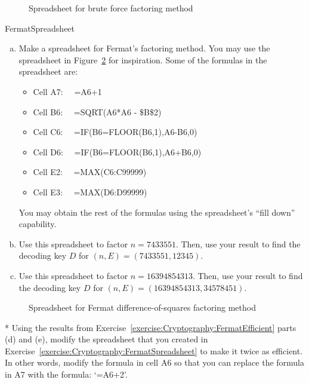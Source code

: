 \begin{figure}[h]
\caption{Spreadsheet for brute force factoring method}
\label{fig:bf}
\end{figure}


\begin{exercise}{FermatSpreadsheet}
\begin{enumerate}[(a)]
\item
Make a spreadsheet for Fermat's factoring method. You may use the spreadsheet in Figure~\ref{fig:FermaFact} for inspiration. Some of the formulas in the spreadsheet are:
\begin{itemize}
\item
Cell A7: ~~=A6+1
\item
Cell B6:  ~~=SQRT(A6*A6 - \$B\$2)
\item
Cell C6:  ~~=IF(B6=FLOOR(B6,1),A6-B6,0)
\item
Cell D6:  ~~=IF(B6=FLOOR(B6,1),A6+B6,0)
\item
Cell E2: ~~=MAX(C6:C99999)
\item
Cell E3: ~~=MAX(D6:D99999)
\end{itemize}
You may obtain the rest of the formulas using the spreadsheet's ``fill down'' capability.
\item
Use this spreadsheet to factor $n=7433551$. Then, use your result to find the decoding key $D$ for $(n,E) = (7433551,12345)$.
\item
Use this spreadsheet to factor $n=16394854313$. Then, use your result to find the decoding key $D$ for $(n,E) = (16394854313,34578451)$. 
\end{enumerate}
\end{exercise}


\begin{figure}[h]
\caption{Spreadsheet for Fermat difference-of-squares factoring method}
\label{fig:FermaFact}
\end{figure}

\begin{exercise}{}
* Using the results from Exercise~\ref{exercise:Cryptography:FermatEfficient} parts (d) and (e), modify the spreadsheet that you created in Exercise~\ref{exercise:Cryptography:FermatSpreadsheet} to make it twice as efficient.  In other words, modify the formula in cell A6 so that you can replace the formula in A7 with the formula: `=A6+2'.
\end{exercise}

